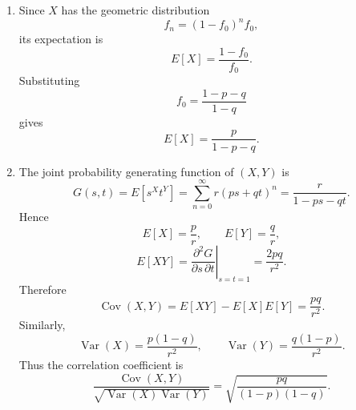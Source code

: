 \documentclass[10pt,a4paper]{article}
\begin{document}
\begin{enumerate}
\begin{enumerate}
          \item From the result above,
                \[
                  \boxed{
                  f_n=(1-f_0)^nf_0.}
                \]
        \end{enumerate}

  \item Since $X$ has the geometric distribution
        \[
          f_n=(1-f_0)^nf_0,
        \]
        its expectation is
        \[
          E[X]=\frac{1-f_0}{f_0}.
        \]
        Substituting
        \[
          f_0=\frac{1-p-q}{1-q}
        \]
        gives
        \[
          \boxed{
          E[X]=\frac{p}{1-p-q}.}
        \]

  \item The joint probability generating function of $(X,Y)$ is
        \[
          G(s,t)=E[s^Xt^Y]
          =
          \sum_{n=0}^\infty r(ps+qt)^n
          =
          \frac{r}{1-ps-qt}.
        \]
        Hence
        \[
          E[X]=\frac{p}{r},
          \qquad
          E[Y]=\frac{q}{r},
        \]
        \[
          E[XY]
          =
          \left.\frac{\partial^2G}{\partial s\,\partial t}\right|_{s=t=1}
          =
          \frac{2pq}{r^2}.
        \]
        Therefore
        \[
          \operatorname{Cov}(X,Y)
          =
          E[XY]-E[X]E[Y]
          =
          \frac{pq}{r^2}.
        \]
        Similarly,
        \[
          \operatorname{Var}(X)=\frac{p(1-q)}{r^2},
          \qquad
          \operatorname{Var}(Y)=\frac{q(1-p)}{r^2}.
        \]
        Thus the correlation coefficient is
        \[
          \frac{\operatorname{Cov}(X,Y)}
          {\sqrt{\operatorname{Var}(X)\operatorname{Var}(Y)}}
          =
          \boxed{
          \sqrt{\frac{pq}{(1-p)(1-q)}}.}
        \]
\end{enumerate}
\end{document}
